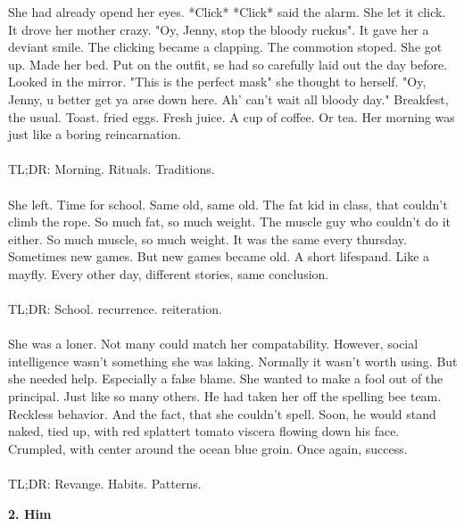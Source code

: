 \documentclass[]{article}
\begin{document}
She had already opend her eyes. *Click* *Click* said the alarm. She let it click. It drove her mother crazy. "Oy, Jenny, stop the bloody ruckus". It gave her a deviant smile. The clicking became a clapping. The commotion stoped. She got up. Made her bed. Put on the outfit, se had so carefully laid out the day before. Looked in the mirror. "This is the perfect mask" she thought to herself. "Oy, Jenny, u better get ya arse down here. Ah' can't wait all bloody day." Breakfest, the usual. Toast. fried eggs. Fresh juice. A cup of coffee. Or tea. Her morning was just like a boring reincarnation.
\\ \\
TL;DR: Morning. Rituals. Traditions.
\\ \\
She left. Time for school. Same old, same old. The fat kid in class, that couldn't climb the rope. So much fat, so much weight. The muscle guy who couldn't do it either. So much muscle, so much weight. It was the same every thursday. Sometimes new games. But new games became old. A short lifespand. Like a mayfly. Every other day, different stories, same conclusion. 
\\ \\
TL;DR: School. recurrence. reiteration.
\\ \\
She was a loner. Not many could match her compatability. However, social intelligence wasn't something she was laking. Normally it wasn't worth using. But she needed help. Especially a false blame. She wanted to make a fool out of the principal. Just like so many others. He had taken her off the spelling bee team. Reckless behavior. And the fact, that she couldn't spell. Soon, he would stand naked, tied up, with red splattert tomato viscera flowing down his face. Crumpled, with center around the ocean blue groin. Once again, success.
\\ \\
TL;DR: Revange. Habits. Patterns.

\newpage

\begin{center}
	\large\textbf{2. Him}
\end{center}
\end{document}
